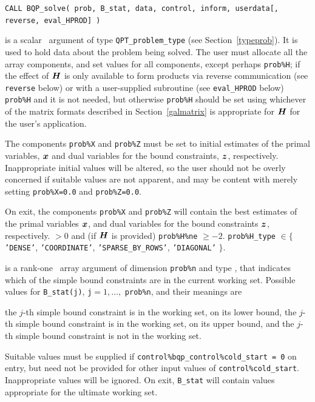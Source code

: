 \documentclass{galahad}
\newcommand{\packagename}{BQP}
\begin{document}
\hspace{8mm}
{\tt CALL \packagename\_solve( prob, B\_stat, data, control, inform, userdata[,
reverse, eval\_HPROD] )}           
%

\vspace*{-3mm}
\begin{description}
 is a scalar \intentinout\ argument of type 
{\tt QPT\_problem\_type}
(see Section~\ref{typeprob}). 
It is used to hold data about the problem being solved.
The user must allocate all the array components,
and set values for all components, except perhaps {\tt prob\%H};
if the effect of ${\bm{H}}$ is only available to form products 
via reverse communication (see {\tt reverse} below)
or with a user-supplied subroutine (see {\tt eval\_HPROD} below)
{\tt prob\%H} and it is not needed, but otherwise {\tt prob\%H} should be
set using whichever
of the matrix formats described in Section~\ref{galmatrix} 
is appropriate for ${\bm{H}}$ for the user's application.

The components {\tt prob\%X} and {\tt prob\%Z}
must be set to initial estimates of the primal variables, 
${\bm{x}}$ and dual variables for the bound constraints, ${\bm{z}}$, respectively.
Inappropriate initial values will be altered, so the user should
not be overly concerned if suitable values are not apparent, and may be
content with merely setting {\tt prob\%X=0.0}
and {\tt prob\%Z=0.0}.

On exit, the components {\tt prob\%X} and {\tt prob\%Z}
will contain the best estimates of the primal variables ${\bm{x}}$, 
and dual variables for the bound constraints ${\bm{z}}$, respectively.
 $> 0$
              and (if ${\bm{H}}$ is provided) {\tt prob\%H\%ne} $\geq -2$.
{\tt prob\%H\_type} $\in \{${\tt 'DENSE'}, 
 {\tt 'COORDINATE'}, {\tt 'SPARSE\_BY\_\-ROWS'}, {\tt 'DIAGONAL'} $\}$. 

 is a rank-one \intentinout\ array argument of dimension {\tt prob\%n}
and type \integer, that indicates which of the simple bound 
constraints are in the current working set. Possible values for 
{\tt B\_stat(j)}, {\tt j}$=1, \ldots ,$ {\tt prob\%n}, and their meanings are
\begin{description}
 the $j$-th simple bound constraint 
is in the working set, on its lower bound,
 the $j$-th simple bound constraint 
is in the working set, on its upper bound, and
  the $j$-th simple bound constraint is not in the working set.
\end{description}
Suitable values must be supplied if 
{\tt control\%bqp\_control\%cold\_start = 0} on entry,
but need not be provided for other input values of {\tt control\%cold\_start}.
Inappropriate values will be ignored.
On exit, {\tt B\_stat} will contain values appropriate for the ultimate
working set.


\end{description}
\end{document}
